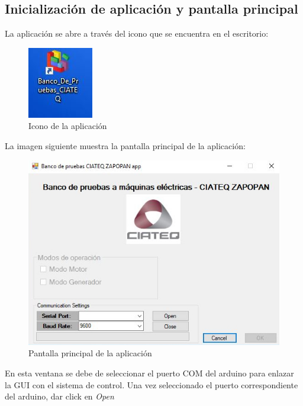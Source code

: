 \documentclass[12pt,titlepage]{article}
\begin{document}
\subsection{Inicialización de aplicación y pantalla principal}
La aplicación se abre a través del icono que se encuentra en el escritorio: \\ 

\begin{figure}[htbp]
\hspace*{6.9cm} 
\includegraphics[scale=0.92]{icono}
\caption{Icono de la aplicación}
\end{figure}

La imagen siguiente muestra la pantalla principal de la aplicación:  \\

\begin{figure}[htbp]
\hspace*{2.8cm} 
\includegraphics[scale=0.72]{main_screen}
\caption{Pantalla principal de la aplicación}
\end{figure}

En esta  ventana se debe de seleccionar el puerto COM del arduino para enlazar la GUI con el sistema de control. Una vez seleccionado el puerto correspondiente del arduino, dar click en \textit{Open} \\
\end{document}
